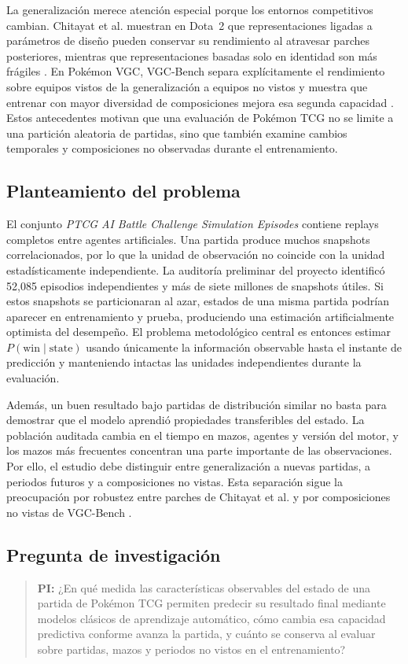 La generalización merece atención especial porque los entornos
competitivos cambian. Chitayat et al. muestran en Dota~2 que
representaciones ligadas a parámetros de diseño pueden conservar su
rendimiento al atravesar parches posteriores, mientras que
representaciones basadas solo en identidad son más frágiles
\cite{chitayat_meta_2023}. En Pokémon VGC, VGC-Bench separa explícitamente
el rendimiento sobre equipos vistos de la generalización a equipos no
vistos y muestra que entrenar con mayor diversidad de composiciones
mejora esa segunda capacidad \cite{angliss_vgcbench_2026}. Estos
antecedentes motivan que una evaluación de Pokémon TCG no se limite a
una partición aleatoria de partidas, sino que también examine cambios
temporales y composiciones no observadas durante el entrenamiento.

\subsection{Planteamiento del problema}
\label{subsec:problema}
El conjunto \emph{PTCG AI Battle Challenge Simulation Episodes} contiene
replays completos entre agentes artificiales. Una partida produce
muchos snapshots correlacionados, por lo que la unidad de observación
no coincide con la unidad estadísticamente independiente. La auditoría
preliminar del proyecto identificó 52,085 episodios independientes y
más de siete millones de snapshots útiles. Si estos snapshots se
particionaran al azar, estados de una misma partida podrían aparecer en
entrenamiento y prueba, produciendo una estimación artificialmente
optimista del desempeño. El problema metodológico central es entonces
estimar $P(\mathrm{win}\mid\mathrm{state})$ usando únicamente la
información observable hasta el instante de predicción y manteniendo
intactas las unidades independientes durante la evaluación.

Además, un buen resultado bajo partidas de distribución similar no
basta para demostrar que el modelo aprendió propiedades transferibles
del estado. La población auditada cambia en el tiempo en mazos, agentes
y versión del motor, y los mazos más frecuentes concentran una parte
importante de las observaciones. Por ello, el estudio debe distinguir
entre generalización a nuevas partidas, a periodos futuros y a
composiciones no vistas. Esta separación sigue la preocupación por
robustez entre parches de Chitayat et al. y por composiciones no vistas
de VGC-Bench \cite{chitayat_meta_2023,angliss_vgcbench_2026}.

\subsection{Pregunta de investigación}
\label{subsec:pregunta}
\begin{quote}
\textbf{PI:} ¿En qué medida las características observables del estado
de una partida de Pokémon TCG permiten predecir su resultado final
mediante modelos clásicos de aprendizaje automático, cómo cambia esa
capacidad predictiva conforme avanza la partida, y cuánto se conserva
al evaluar sobre partidas, mazos y periodos no vistos en el
entrenamiento?
\end{quote}

